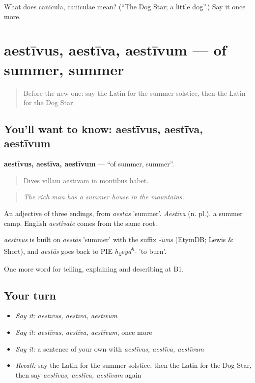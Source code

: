 \begin{tcolorbox}[breakable,colback=teal!4,colframe=teal!35!black,title={Before you move on}]
What does canīcula, canīculae mean? (\textquotedblleft{}The Dog Star; a little dog\textquotedblright{}.) Say it once more.
\end{tcolorbox}
\section[aestīvus, aestīva, aestīvum]{aestīvus, aestīva, aestīvum — of summer, summer}

\label{lesson:LA-C488-aestivus}



\begin{quote}
Before the new one: say the Latin for the summer solstice, then the Latin for the Dog Star.
\end{quote}

\subsection*{You'll want to know: aestīvus, aestīva, aestīvum}
\textbf{aestīvus, aestīva, aestīvum} — \textquotedblleft{}of summer, summer\textquotedblright{}.

\begin{quote}
Dīves vīllam aestīvam in montibus habet.
\end{quote}

\begin{quote}
\emph{The rich man has a summer house in the mountains.}
\end{quote}

An adjective of three endings, from \emph{aestās} 'summer'. \emph{Aestīva} (n. pl.), a summer camp. English \emph{aestivate} comes from the same root.

\begin{cousinweb}
\emph{aestīvus} is built on \emph{aestās} 'summer' with the suffix \emph{-īvus} (EtymDB; Lewis \& Short), and \emph{aestās} goes back to PIE \emph{h\textsubscript{2}eyd\textsuperscript{h}-} 'to burn'.
\end{cousinweb}

\begin{grammarlens}[title={What you've built}]
One more word for telling, explaining and describing at B1.
\end{grammarlens}

\subsection*{Your turn}
\begin{itemize}
\raggedright
  \item \emph{Say it:} \emph{aestīvus, aestīva, aestīvum}
  \item \emph{Say it:} \emph{aestīvus, aestīva, aestīvum}, once more
  \item \emph{Say it:} a sentence of your own with \emph{aestīvus, aestīva, aestīvum}
  \item \emph{Recall:} say the Latin for the summer solstice, then the Latin for the Dog Star, then say \emph{aestīvus, aestīva, aestīvum} again
\end{itemize}

